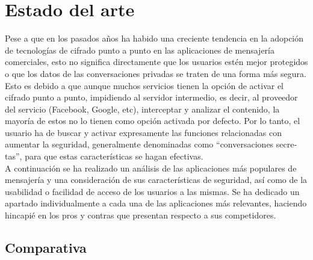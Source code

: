\chapter{Estado del arte}

Pese a que en los pasados años ha habido una creciente tendencia en la adopción de tecnologías de cifrado punto a punto en las aplicaciones de mensajería comerciales, esto no significa directamente que los usuarios estén mejor protegidos o que los datos de las conversaciones privadas se traten de una forma más segura. \\

Esto es debido a que aunque muchos servicios tienen la opción de activar el cifrado punto a punto, impidiendo al servidor intermedio, es decir, al proveedor del servicio (Facebook, Google, etc), interceptar y analizar el contenido, la mayoría de estos no lo tienen como opción activada por defecto. Por lo tanto, el usuario ha de buscar y activar expresamente las funciones relacionadas con aumentar la seguridad, generalmente  denominadas como \hyphenquote{spanish}{conversaciones secretas}, para que estas características se hagan efectivas. \\

A continuación se ha realizado un análisis de las aplicaciones más populares de mensajería y una consideración de sus características de seguridad, así como de la usabilidad o facilidad de acceso de los usuarios a las mismas. Se ha dedicado un apartado individualmente a cada una de las aplicaciones más relevantes, haciendo hincapié en los pros y contras que presentan respecto a sus competidores. \\

\pagebreak

\section {Comparativa}

